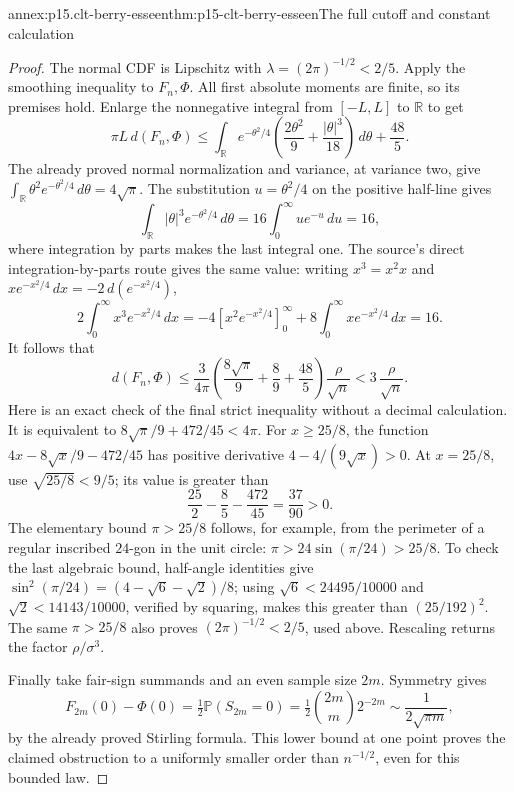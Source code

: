 \begin{annexitem}{annex:p15.clt-berry-esseen}{thm:p15-clt-berry-esseen}{The full cutoff and constant calculation}
\begin{proof}
The normal CDF is Lipschitz with
\(\lambda=(2\pi)^{-1/2}<2/5\).
Apply the smoothing inequality to \(F_n,\Phi\).
All first absolute moments are finite, so its premises hold.
Enlarge the nonnegative integral from \([-L,L]\) to
\(\mathbb R\) to get
\[
 \pi L\,d(F_n,\Phi)
 \leq
 \int_{\mathbb R} e^{-\theta^2/4}
       \left(\frac{2\theta^2}{9}+\frac{|\theta|^3}{18}\right)\,d\theta
                                           +\frac{48}{5}.
 \]
The already proved normal normalization and variance, at variance
two, give \(\int_{\mathbb R}\theta^2e^{-\theta^2/4}\,d\theta
=4\sqrt\pi\).
The substitution \(u=\theta^2/4\) on the positive half-line gives
\[
 \int_{\mathbb R}|\theta|^3e^{-\theta^2/4}\,d\theta
 =16\int_0^\infty ue^{-u}\,du=16,
 \]
where integration by parts makes the last integral one.
The source's direct integration-by-parts route gives the same
value: writing \(x^3=x^2x\) and
\(xe^{-x^2/4}\,dx=-2\,d(e^{-x^2/4})\),
\[
 2\int_0^\infty x^3e^{-x^2/4}\,dx
 =-4[x^2e^{-x^2/4}]_0^\infty
                         +8\int_0^\infty xe^{-x^2/4}\,dx=16.
 \]
It follows that
\[
 d(F_n,\Phi)
 \leq \frac{3}{4\pi}
       \left(\frac{8\sqrt\pi}{9}+\frac89+\frac{48}{5}\right)
       \frac{\rho}{\sqrt n}
 <3\,\frac{\rho}{\sqrt n}.
 \]
Here is an exact check of the final strict inequality without a
decimal calculation. It is equivalent to
\(8\sqrt\pi/9+472/45<4\pi\).
For \(x\geq25/8\), the function
\(4x-8\sqrt{x}/9-472/45\) has positive derivative
\(4-4/(9\sqrt x)>0\).
At \(x=25/8\), use \(\sqrt{25/8}<9/5\); its value is greater than
\[
 \frac{25}{2}-\frac85-\frac{472}{45}
 =\frac{37}{90}>0.
 \]
The elementary bound \(\pi>25/8\) follows, for example, from
the perimeter of a regular inscribed \(24\)-gon in the unit
circle: \(\pi>24\sin(\pi/24)>25/8\).
To check the last algebraic bound, half-angle identities give
\(\sin^2(\pi/24)=(4-\sqrt6-\sqrt2)/8\);
using \(\sqrt6<24495/10000\) and
\(\sqrt2<14143/10000\), verified by squaring, makes this
greater than \((25/192)^2\).
The same \(\pi>25/8\) also proves
\((2\pi)^{-1/2}<2/5\), used above.
Rescaling returns the factor \(\rho/\sigma^3\).

Finally take fair-sign summands and an even sample size \(2m\).
Symmetry gives
\[
 F_{2m}(0)-\Phi(0)
 =\tfrac12\mathbb P(S_{2m}=0)
 =\tfrac12\binom{2m}{m}2^{-2m}
 \sim\frac1{2\sqrt{\pi m}},
 \]
by the already proved Stirling formula. This lower bound at
one point proves the claimed obstruction to a uniformly smaller
order than \(n^{-1/2}\), even for this bounded law.
\end{proof}
\end{annexitem}

